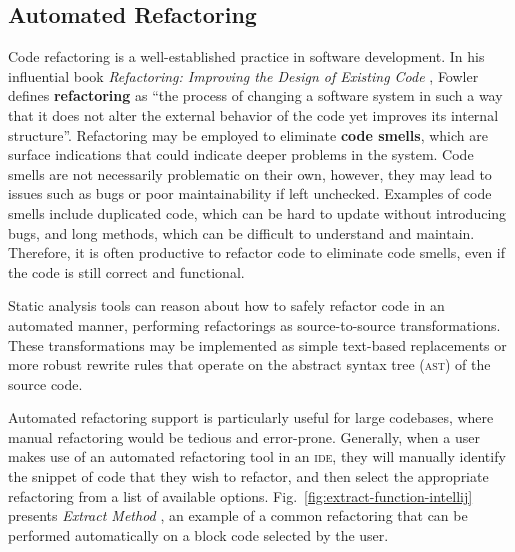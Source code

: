 \subsection{Automated Refactoring}
Code refactoring is a well-established practice in software development.
In his influential book \textit{Refactoring: Improving the Design of Existing Code} \cite{fowler_refactoring_2018}, Fowler defines \textbf{refactoring} as ``the process of changing a software system in such a way that it does not alter the external behavior of the code yet improves its internal structure''.
Refactoring may be employed to eliminate \textbf{code smells}, which are surface indications that could indicate deeper problems in the system.
Code smells are not necessarily problematic on their own, however, they may lead to issues such as bugs or poor maintainability if left unchecked.
Examples of code smells include duplicated code, which can be hard to update without introducing bugs, and long methods, which can be difficult to understand and maintain.
Therefore, it is often productive to refactor code to eliminate code smells, even if the code is still correct and functional.

Static analysis tools can reason about how to safely refactor code in an automated manner, performing refactorings as source-to-source transformations.
These transformations may be implemented as simple text-based replacements or more robust rewrite rules that operate on the abstract syntax tree (\textsc{ast}) of the source code.

Automated refactoring support is particularly useful for large codebases, where manual refactoring would be tedious and error-prone.
Generally, when a user makes use of an automated refactoring tool in an \textsc{ide}, they will manually identify the snippet of code that they wish to refactor, and then select the appropriate refactoring from a list of available options.
Fig.~\ref{fig:extract-function-intellij} presents \textit{Extract Method} \cite{fowler_refactoring_2018}, an example of a common refactoring that can be performed automatically on a block code selected by the user.

